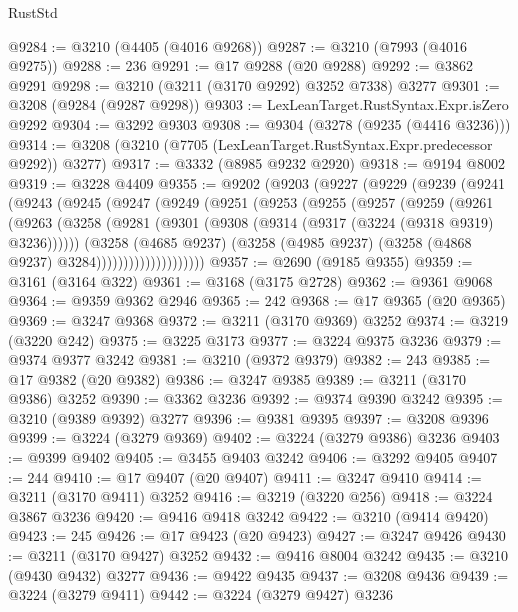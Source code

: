 \begin{lexlean}{RustStd}
\begin{coremodule}
@9284 := @3210 (@4405 (@4016 @9268))
@9287 := @3210 (@7993 (@4016 @9275))
@9288 := 236
@9291 := @17 @9288 (@20 @9288)
@9292 := @3862 @9291
@9298 := @3210 (@3211 (@3170 @9292) @3252 @7338) @3277
@9301 := @3208 (@9284 (@9287 @9298))
@9303 := LexLeanTarget.RustSyntax.Expr.isZero @9292
@9304 := @3292 @9303
@9308 := @9304 (@3278 (@9235 (@4416 @3236)))
@9314 := @3208 (@3210 (@7705 (LexLeanTarget.RustSyntax.Expr.predecessor @9292)) @3277)
@9317 := @3332 (@8985 @9232 @2920)
@9318 := @9194 @8002
@9319 := @3228 @4409
@9355 := @9202
    (@9203
      (@9227
        (@9229
          (@9239
            (@9241
              (@9243
                (@9245
                  (@9247
                    (@9249
                      (@9251
                        (@9253
                          (@9255
                            (@9257
                              (@9259
                                (@9261
                                  (@9263
                                    (@3258
                                      (@9281
                                        (@9301 (@9308 (@9314 (@9317 (@3224 (@9318 @9319) @3236))))))
                                      (@3258
                                        (@4685 @9237)
                                        (@3258
                                          (@4985 @9237)
                                          (@3258 (@4868 @9237) @3284))))))))))))))))))))
@9357 := @2690 (@9185 @9355)
@9359 := @3161 (@3164 @322)
@9361 := @3168 (@3175 @2728)
@9362 := @9361 @9068
@9364 := @9359 @9362 @2946
@9365 := 242
@9368 := @17 @9365 (@20 @9365)
@9369 := @3247 @9368
@9372 := @3211 (@3170 @9369) @3252
@9374 := @3219 (@3220 @242)
@9375 := @3225 @3173
@9377 := @3224 @9375 @3236
@9379 := @9374 @9377 @3242
@9381 := @3210 (@9372 @9379)
@9382 := 243
@9385 := @17 @9382 (@20 @9382)
@9386 := @3247 @9385
@9389 := @3211 (@3170 @9386) @3252
@9390 := @3362 @3236
@9392 := @9374 @9390 @3242
@9395 := @3210 (@9389 @9392) @3277
@9396 := @9381 @9395
@9397 := @3208 @9396
@9399 := @3224 (@3279 @9369)
@9402 := @3224 (@3279 @9386) @3236
@9403 := @9399 @9402
@9405 := @3455 @9403 @3242
@9406 := @3292 @9405
@9407 := 244
@9410 := @17 @9407 (@20 @9407)
@9411 := @3247 @9410
@9414 := @3211 (@3170 @9411) @3252
@9416 := @3219 (@3220 @256)
@9418 := @3224 @3867 @3236
@9420 := @9416 @9418 @3242
@9422 := @3210 (@9414 @9420)
@9423 := 245
@9426 := @17 @9423 (@20 @9423)
@9427 := @3247 @9426
@9430 := @3211 (@3170 @9427) @3252
@9432 := @9416 @8004 @3242
@9435 := @3210 (@9430 @9432) @3277
@9436 := @9422 @9435
@9437 := @3208 @9436
@9439 := @3224 (@3279 @9411)
@9442 := @3224 (@3279 @9427) @3236

\end{coremodule}
\end{lexlean}
